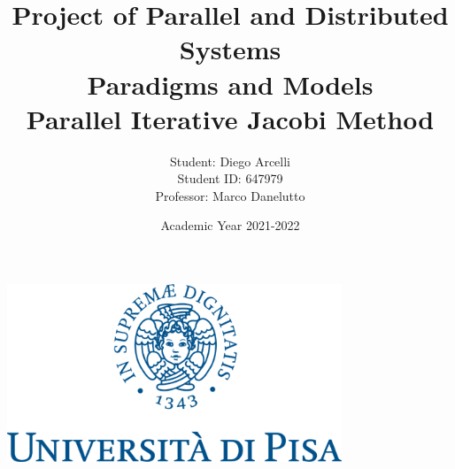 \documentclass[12pt]{article}
\begin{document}
	
	\begin{titlepage}
		
		\title{Project of Parallel and Distributed Systems\\Paradigms and Models \\\vspace{1cm}
		Parallel Iterative Jacobi Method}
		\author{Student: Diego Arcelli\\ Student ID: 647979 \\
			Professor: Marco  Danelutto}
		\date{Academic Year 2021-2022}
		\maketitle
		\centering
		\includegraphics[width=10cm]{./images/unipi_logo.png}
		
	\end{titlepage}
	
	\tableofcontents
	\newpage
	
\end{document}
